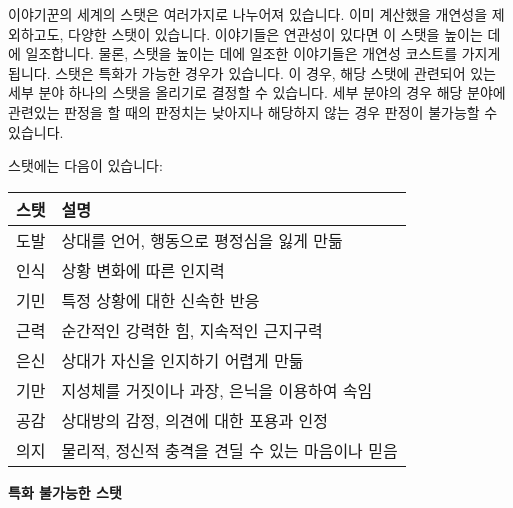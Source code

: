 \documentclass{report}
\begin{document}
	이야기꾼의 세계의 스탯은 여러가지로 나누어져 있습니다. 이미 계산했을 개연성을 제외하고도, 다양한 스탯이 있습니다. 이야기들은 연관성이 있다면 이 스탯을 높이는 데에 일조합니다. 물론, 스탯을 높이는 데에 일조한 이야기들은 개연성 코스트를 가지게 됩니다.
	스탯은 특화가 가능한 경우가 있습니다. 이 경우, 해당 스탯에 관련되어 있는 세부 분야 하나의 스탯을 올리기로 결정할 수 있습니다. 세부 분야의 경우 해당 분야에 관련있는 판정을 할 때의 판정치는 낮아지나 해당하지 않는 경우 판정이 불가능할 수 있습니다.
	
	스탯에는 다음이 있습니다:
	
	\smallskip
	
	\begin{minipage}{\textwidth}
		\begin{tabularx}{\textwidth}{c!{\color{black}\vrule}X}
			\hline
			\textbf{스탯} & \textbf{설명}\\ \hline \hline
			도발          & 상대를 언어, 행동으로 평정심을 잃게 만듦\\\hline
			인식          & 상황 변화에 따른 인지력          \\\hline
			기민          & 특정 상황에 대한 신속한 반응       \\\hline
			근력          & 순간적인 강력한 힘, 지속적인 근지구력  \\\hline
			은신          & 상대가 자신을 인지하기 어렵게 만듦    \\\hline
			기만          & 지성체를 거짓이나 과장, 은닉을 이용하여 속임 \\\hline
			공감          & 상대방의 감정, 의견에 대한 포용과 인정 \\\hline
			의지          & 물리적, 정신적 충격을 견딜 수 있는 마음이나 믿음\\\hline
		\end{tabularx}
		
		\smallskip
		
		\begin{tightcenter}
			\textbf{특화 불가능한 스탯}
		\end{tightcenter}
	
	\medskip
	

\end{minipage}
\end{document}
